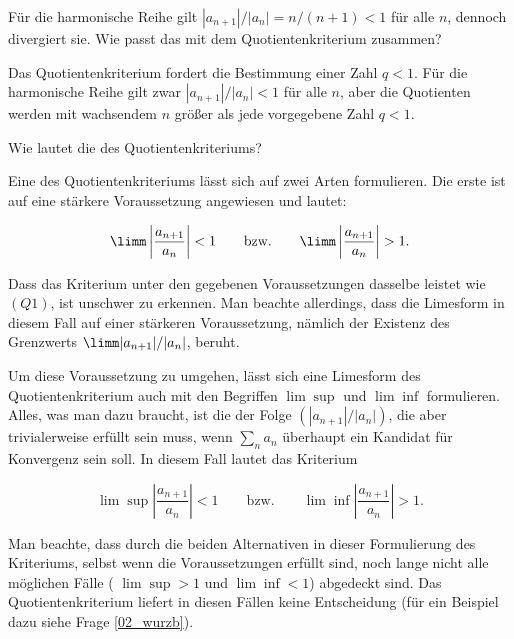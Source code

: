 \begin{frage}
  Für die harmonische Reihe gilt $|a_{n+1}|/|a_n|=n/(n+1)<1$ für alle $n$, 
  dennoch divergiert sie. Wie passt das mit dem Quotientenkriterium 
  zusammen?
\end{frage}

\begin{antwort}
  Das Quotientenkriterium fordert die 
  Bestimmung einer  Zahl $q<1$. 
  Für die harmonische Reihe gilt zwar $|a_{n+1}|/|a_n|<1$ für alle 
  $n$, aber die Quotienten werden  
  mit wachsendem $n$ größer als jede vorgegebene Zahl $q<1$. \AntEnd
\end{antwort}

\begin{frage}
  Wie lautet die  des Quotientenkriteriums?
\end{frage}

\begin{antwort}
  Eine  des Quotientenkriteriums lässt sich auf 
  zwei Arten formulieren. Die erste ist auf eine stärkere Voraussetzung 
  angewiesen und lautet: 

  \medskip
  \noindent
  \[ 
  \limm \left| \frac{a_{n+1}}{a_n} \right| < 1 \qquad\text{bzw.}\qquad
  \limm \left| \frac{a_{n+1}}{a_n}\right| > 1.
  \]

  \medskip
  Dass das Kriterium unter den gegebenen Voraussetzungen dasselbe leistet 
  wie $(Q1)$, ist unschwer zu erkennen. Man beachte allerdings, 
  dass die Limesform in diesem Fall auf einer stärkeren Voraussetzung, 
  nämlich der Existenz des Grenzwerts $\limm |a_{n+1}|/|a_n|$, beruht.

  Um diese Voraussetzung zu umgehen, lässt sich eine 
  Limesform des Quotientenkriterium auch 
  mit den Begriffen $\lim\sup$ und $\lim\inf$ formulieren. 
  Alles, was man dazu braucht, ist die  der 
  Folge $( |a_{n+1}|/|a_n |)$, die aber trivialerweise erfüllt sein muss, 
  wenn $\sum_n a_n$ überhaupt ein Kandidat für Konvergenz sein soll. In 
  diesem Fall lautet das Kriterium

  \medskip
  \noindent
  \[
  \lim \sup \left| \frac{a_{n+1}}{a_n} \right | < 1 \qquad\text{bzw.}\qquad
  \lim \inf \left| \frac{a_{n+1}}{a_n} \right | > 1. 
  \]

  \medskip\noindent
  Man beachte, dass durch die beiden Alternativen in dieser Formulierung 
  des Kriteriums, selbst wenn die Voraussetzungen 
  erfüllt sind, noch lange nicht alle möglichen Fälle ({\zB} 
  $\lim\sup>1$ und $\lim\inf <1$) abgedeckt sind. Das Quotientenkriterium 
  liefert in diesen Fällen keine Entscheidung (für ein Beispiel dazu siehe 
  Frage \ref{02_wurzb}). 
\end{antwort}

